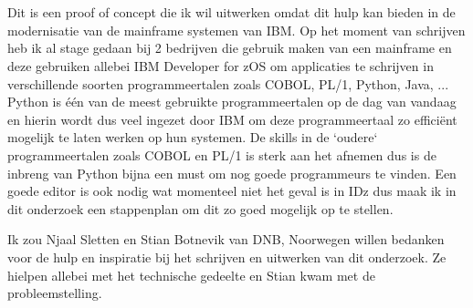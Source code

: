 
\chapter*{}%
\label{ch:voorwoord}


Dit is een proof of concept die ik wil uitwerken omdat dit hulp kan bieden in de modernisatie van de mainframe systemen van IBM. Op het moment van schrijven heb ik al stage gedaan bij 2 bedrijven die gebruik maken van een mainframe en deze gebruiken allebei IBM Developer for zOS om applicaties te schrijven in verschillende soorten programmeertalen zoals COBOL, PL/1, Python, Java, ... Python is één van de meest gebruikte programmeertalen op de dag van vandaag en hierin wordt dus veel ingezet door IBM om deze programmeertaal zo efficiënt mogelijk te laten werken op hun systemen. De skills in de `oudere` programmeertalen zoals COBOL en PL/1 is sterk aan het afnemen dus is de inbreng van Python bijna een must om nog goede programmeurs te vinden. Een goede editor is ook nodig wat momenteel niet het geval is in IDz dus maak ik in dit onderzoek een stappenplan om dit zo goed mogelijk op te stellen.

Ik zou Njaal Sletten en Stian Botnevik van DNB, Noorwegen willen bedanken voor de hulp en inspiratie bij het schrijven en uitwerken van dit onderzoek. Ze hielpen allebei met het technische gedeelte en Stian kwam met de probleemstelling.